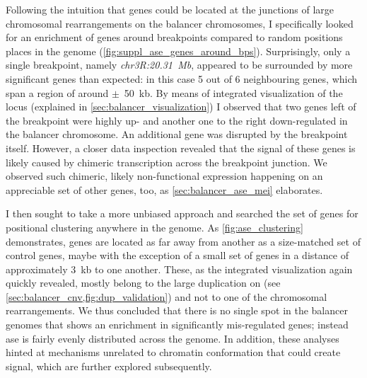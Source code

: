 Following the intuition that \ase genes could be located at the junctions of
large chromosomal rearrangements on the balancer chromosomes, I specifically
looked for an enrichment of \ase genes around breakpoints compared to random
positions places in the genome (\cref{fig:suppl_ase_genes_around_bps}).
Surprisingly, only a single breakpoint, namely \textit{chr3R:20.31~Mb},
appeared to be surrounded by more significant genes than expected: in this case
5 out of 6 neighbouring genes, which span a region of around $\pm$~50~kb.
By means of integrated visualization of the locus (explained in
\cref{sec:balancer_visualization}) I observed that two genes left of the
breakpoint were highly up- and another one to the right down-regulated in the
balancer chromosome. An additional gene was disrupted by the breakpoint itself.
However, a closer data inspection revealed that the \ase signal of these genes
is likely caused by chimeric transcription across the breakpoint junction. We
observed such chimeric, likely non-functional expression happening on an
appreciable set of other genes, too, as \cref{sec:balancer_ase_mei} elaborates.


I then sought to take a more unbiased approach and searched the set of \ase
genes for positional clustering anywhere in the genome.
As \cref{fig:ase_clustering} demonstrates, \ase genes are located as far away
from another as a size-matched set of control genes, maybe with the exception of
a small set of genes in a distance of approximately 3~kb to one another.
These, as the integrated visualization again quickly revealed, mostly belong to
the large duplication on \cyo (see \cref{sec:balancer_cnv,fig:dup_validation})
and not to one of the chromosomal rearrangements. We thus concluded that there
is no single spot in the balancer genomes that shows an enrichment in
significantly mis-regulated genes; instead \acl{ase} is fairly
evenly distributed across the genome. In addition, these analyses hinted at
mechanisms unrelated to chromatin conformation that could create \ase signal,
which are further explored subsequently.





